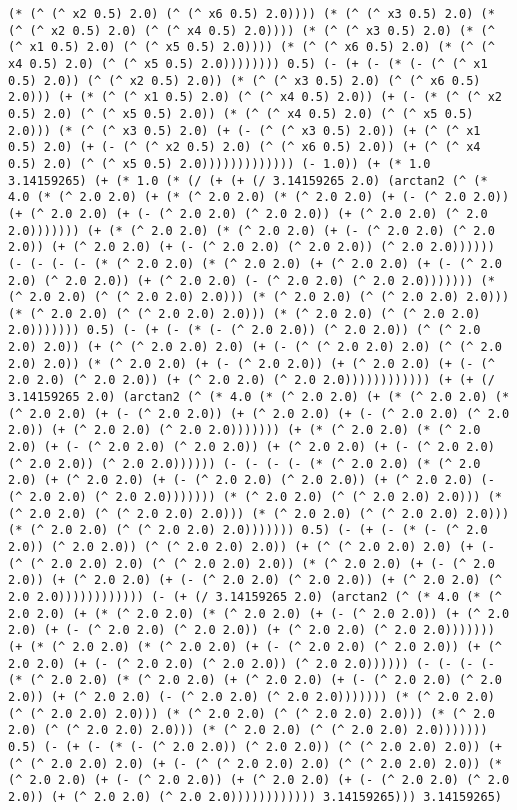 \begin{lstlisting}
(* (^ (^ x2 0.5) 2.0) (^ (^ x6 0.5) 2.0)))) (* (^ (^ x3 0.5) 2.0) (* (^ (^ x2 0.5) 2.0) (^ (^ x4 0.5) 2.0)))) (* (^ (^ x3 0.5) 2.0) (* (^ (^ x1 0.5) 2.0) (^ (^ x5 0.5) 2.0)))) (* (^ (^ x6 0.5) 2.0) (* (^ (^ x4 0.5) 2.0) (^ (^ x5 0.5) 2.0)))))))) 0.5) (- (+ (- (* (- (^ (^ x1 0.5) 2.0)) (^ (^ x2 0.5) 2.0)) (* (^ (^ x3 0.5) 2.0) (^ (^ x6 0.5) 2.0))) (+ (* (^ (^ x1 0.5) 2.0) (^ (^ x4 0.5) 2.0)) (+ (- (* (^ (^ x2 0.5) 2.0) (^ (^ x5 0.5) 2.0)) (* (^ (^ x4 0.5) 2.0) (^ (^ x5 0.5) 2.0))) (* (^ (^ x3 0.5) 2.0) (+ (- (^ (^ x3 0.5) 2.0)) (+ (^ (^ x1 0.5) 2.0) (+ (- (^ (^ x2 0.5) 2.0) (^ (^ x6 0.5) 2.0)) (+ (^ (^ x4 0.5) 2.0) (^ (^ x5 0.5) 2.0))))))))))))) (- 1.0)) (+ (* 1.0 3.14159265) (+ (* 1.0 (* (/ (+ (+ (/ 3.14159265 2.0) (arctan2 (^ (* 4.0 (* (^ 2.0 2.0) (+ (* (^ 2.0 2.0) (* (^ 2.0 2.0) (+ (- (^ 2.0 2.0)) (+ (^ 2.0 2.0) (+ (- (^ 2.0 2.0) (^ 2.0 2.0)) (+ (^ 2.0 2.0) (^ 2.0 2.0))))))) (+ (* (^ 2.0 2.0) (* (^ 2.0 2.0) (+ (- (^ 2.0 2.0) (^ 2.0 2.0)) (+ (^ 2.0 2.0) (+ (- (^ 2.0 2.0) (^ 2.0 2.0)) (^ 2.0 2.0)))))) (- (- (- (- (* (^ 2.0 2.0) (* (^ 2.0 2.0) (+ (^ 2.0 2.0) (+ (- (^ 2.0 2.0) (^ 2.0 2.0)) (+ (^ 2.0 2.0) (- (^ 2.0 2.0) (^ 2.0 2.0))))))) (* (^ 2.0 2.0) (^ (^ 2.0 2.0) 2.0))) (* (^ 2.0 2.0) (^ (^ 2.0 2.0) 2.0))) (* (^ 2.0 2.0) (^ (^ 2.0 2.0) 2.0))) (* (^ 2.0 2.0) (^ (^ 2.0 2.0) 2.0))))))) 0.5) (- (+ (- (* (- (^ 2.0 2.0)) (^ 2.0 2.0)) (^ (^ 2.0 2.0) 2.0)) (+ (^ (^ 2.0 2.0) 2.0) (+ (- (^ (^ 2.0 2.0) 2.0) (^ (^ 2.0 2.0) 2.0)) (* (^ 2.0 2.0) (+ (- (^ 2.0 2.0)) (+ (^ 2.0 2.0) (+ (- (^ 2.0 2.0) (^ 2.0 2.0)) (+ (^ 2.0 2.0) (^ 2.0 2.0)))))))))))) (+ (+ (/ 3.14159265 2.0) (arctan2 (^ (* 4.0 (* (^ 2.0 2.0) (+ (* (^ 2.0 2.0) (* (^ 2.0 2.0) (+ (- (^ 2.0 2.0)) (+ (^ 2.0 2.0) (+ (- (^ 2.0 2.0) (^ 2.0 2.0)) (+ (^ 2.0 2.0) (^ 2.0 2.0))))))) (+ (* (^ 2.0 2.0) (* (^ 2.0 2.0) (+ (- (^ 2.0 2.0) (^ 2.0 2.0)) (+ (^ 2.0 2.0) (+ (- (^ 2.0 2.0) (^ 2.0 2.0)) (^ 2.0 2.0)))))) (- (- (- (- (* (^ 2.0 2.0) (* (^ 2.0 2.0) (+ (^ 2.0 2.0) (+ (- (^ 2.0 2.0) (^ 2.0 2.0)) (+ (^ 2.0 2.0) (- (^ 2.0 2.0) (^ 2.0 2.0))))))) (* (^ 2.0 2.0) (^ (^ 2.0 2.0) 2.0))) (* (^ 2.0 2.0) (^ (^ 2.0 2.0) 2.0))) (* (^ 2.0 2.0) (^ (^ 2.0 2.0) 2.0))) (* (^ 2.0 2.0) (^ (^ 2.0 2.0) 2.0))))))) 0.5) (- (+ (- (* (- (^ 2.0 2.0)) (^ 2.0 2.0)) (^ (^ 2.0 2.0) 2.0)) (+ (^ (^ 2.0 2.0) 2.0) (+ (- (^ (^ 2.0 2.0) 2.0) (^ (^ 2.0 2.0) 2.0)) (* (^ 2.0 2.0) (+ (- (^ 2.0 2.0)) (+ (^ 2.0 2.0) (+ (- (^ 2.0 2.0) (^ 2.0 2.0)) (+ (^ 2.0 2.0) (^ 2.0 2.0)))))))))))) (- (+ (/ 3.14159265 2.0) (arctan2 (^ (* 4.0 (* (^ 2.0 2.0) (+ (* (^ 2.0 2.0) (* (^ 2.0 2.0) (+ (- (^ 2.0 2.0)) (+ (^ 2.0 2.0) (+ (- (^ 2.0 2.0) (^ 2.0 2.0)) (+ (^ 2.0 2.0) (^ 2.0 2.0))))))) (+ (* (^ 2.0 2.0) (* (^ 2.0 2.0) (+ (- (^ 2.0 2.0) (^ 2.0 2.0)) (+ (^ 2.0 2.0) (+ (- (^ 2.0 2.0) (^ 2.0 2.0)) (^ 2.0 2.0)))))) (- (- (- (- (* (^ 2.0 2.0) (* (^ 2.0 2.0) (+ (^ 2.0 2.0) (+ (- (^ 2.0 2.0) (^ 2.0 2.0)) (+ (^ 2.0 2.0) (- (^ 2.0 2.0) (^ 2.0 2.0))))))) (* (^ 2.0 2.0) (^ (^ 2.0 2.0) 2.0))) (* (^ 2.0 2.0) (^ (^ 2.0 2.0) 2.0))) (* (^ 2.0 2.0) (^ (^ 2.0 2.0) 2.0))) (* (^ 2.0 2.0) (^ (^ 2.0 2.0) 2.0))))))) 0.5) (- (+ (- (* (- (^ 2.0 2.0)) (^ 2.0 2.0)) (^ (^ 2.0 2.0) 2.0)) (+ (^ (^ 2.0 2.0) 2.0) (+ (- (^ (^ 2.0 2.0) 2.0) (^ (^ 2.0 2.0) 2.0)) (* (^ 2.0 2.0) (+ (- (^ 2.0 2.0)) (+ (^ 2.0 2.0) (+ (- (^ 2.0 2.0) (^ 2.0 2.0)) (+ (^ 2.0 2.0) (^ 2.0 2.0)))))))))))) 3.14159265))) 3.14159265) 
\end{lstlisting}
